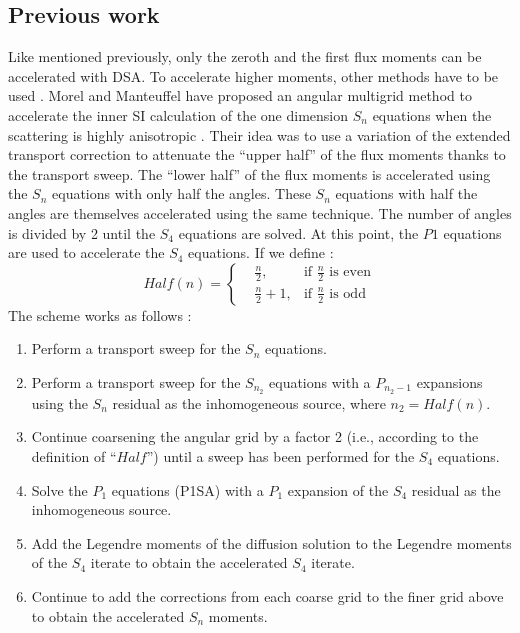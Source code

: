 \subsection{Previous work}
Like mentioned previously, only the zeroth and the first flux moments can be
accelerated with DSA. To accelerate higher moments, other methods have to be
used \cite{kassem,multigrid_1d}. Morel and Manteuffel have proposed an angular 
multigrid method to accelerate the inner SI calculation of the one dimension 
$S_n$ equations when the scattering is highly anisotropic 
\cite{multigrid_1d}. Their idea was to use a variation of the extended
transport correction \cite{lathrop} to attenuate the ``upper half'' of the
flux moments thanks to the transport sweep. The ``lower half'' of the flux
moments is accelerated using the $S_n$ equations with only half the angles.
These $S_n$ equations with half the angles are themselves accelerated using the same
technique. The number of angles is divided by 2 until the $S_4$ equations are
solved. At this point, the $P1$ equations are used to accelerate the $S_4$
equations. If we define :
\begin{equation}
Half(n) = \left\{
\begin{aligned}
&\frac{n}{2}, &\textrm{if $\frac{n}{2}$ is even}\\
&\frac{n}{2}+1, &\textrm{if $\frac{n}{2}$ is odd}
\end{aligned}
\right.
\end{equation}
The scheme works as follows : 
\begin{enumerate}
\item Perform a transport sweep for the $S_n$ equations.
\item Perform a transport sweep for the $S_{n_2}$ equations with a $P_{n_2-1}$
expansions using the $S_n$ residual as the inhomogeneous source, where
$n_2=Half(n)$.
\item Continue coarsening the angular grid by a factor 2 (i.e., according to
the definition of ``$Half$'') until a sweep has been performed for the $S_4$
equations.
\item Solve the $P_1$ equations (P1SA) with a $P_1$ expansion of the $S_4$
residual as the inhomogeneous source.
\item Add the Legendre moments of the diffusion solution to the Legendre
moments of the $S_4$ iterate to obtain the accelerated $S_4$ iterate.
\item Continue to add the corrections from each coarse grid to the finer grid
above to obtain the accelerated $S_n$ moments.
\end{enumerate}
